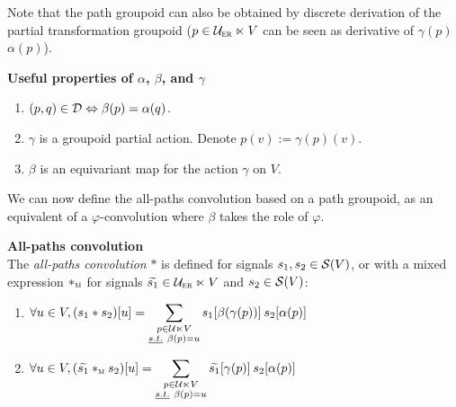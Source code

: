 \begin{remark}Note that the path groupoid 
can also be obtained by discrete derivation of the partial transformation groupoid (\eg $p \in \cuer \ltimes V$ can be seen as derivative of $\gamma(p)$ \wrt $\alpha(p)$).%
\end{remark}

\begin{lemma}\textbf{Useful properties of $\alpha$, $\beta$, and $\gamma$}%
\begin{enumerate}
  \item $(p,q) \in \cd \Leftrightarrow \beta(p) = \alpha(q)$.
  \item $\gamma$ is a groupoid partial action. Denote $p(v) := \gamma(p)(v)$.%
  \item $\beta$ is an equivariant map for the action $\gamma$ on $V$.
\end{enumerate}
\end{lemma}

We can now define the all-paths convolution based on a path groupoid, as an equivalent of a $\varphi$-convolution where $\beta$ takes the role of $\varphi$.

\begin{definition}\textbf{All-paths convolution}\\
The \emph{all-paths convolution} $\ast$ is defined for signals $s_1, s_2 \in \cs(V)$, or with a mixed expression $\ast_{\M}$ for signals $\widetilde{s_1} \in \cuer \ltimes V$ and $s_2 \in \cs(V)$:
\begin{enumerate}[label=(\roman*)]
\item $\forall u \in V, (s_1 \ast s_2) [u] = \displaystyle\sum_{\substack{p \in \cu \ltimes V\\ \st \beta(p)=u}} s_1[\beta(\gamma(p))] \h{2} s_2[\alpha(p)]$
\item $\forall u \in V, (\widetilde{s_1} \ast_{\M} s_2) [u] = \displaystyle\sum_{\substack{p \in \cu \ltimes V\\ \st \beta(p)=u}} \widetilde{s_1}[\gamma(p)] \h{2} s_2[\alpha(p)]$
\end{enumerate}
\end{definition}



